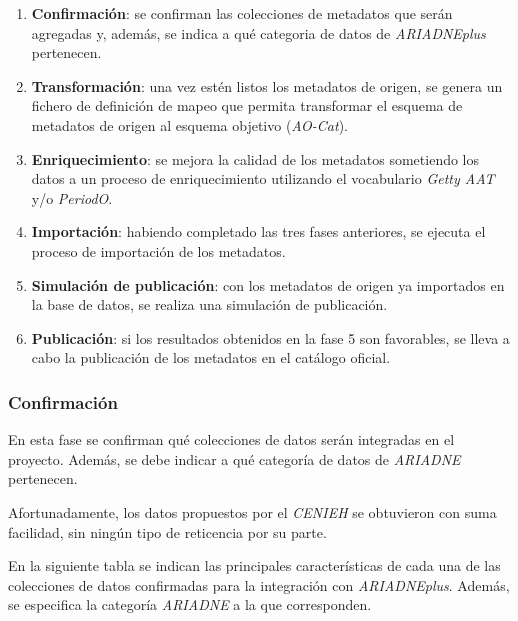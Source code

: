 \begin{enumerate}
\def\labelenumi{\arabic{enumi}.}
\tightlist
\item
  \textbf{Confirmación}: se confirman las colecciones de metadatos que
  serán agregadas y, además, se indica a qué categoria de datos de
  \emph{ARIADNEplus} pertenecen.
\item
  \textbf{Transformación}: una vez estén listos los metadatos de origen,
  se genera un fichero de definición de mapeo que permita transformar el
  esquema de metadatos de origen al esquema objetivo (\emph{AO-Cat}).
\item
  \textbf{Enriquecimiento}: se mejora la calidad de los metadatos
  sometiendo los datos a un proceso de enriquecimiento utilizando el
  vocabulario \emph{Getty AAT} y/o \emph{PeriodO}.
\item
  \textbf{Importación}: habiendo completado las tres fases anteriores,
  se ejecuta el proceso de importación de los metadatos.
\item
  \textbf{Simulación de publicación}: con los metadatos de origen ya
  importados en la base de datos, se realiza una simulación de
  publicación.
\item
  \textbf{Publicación}: si los resultados obtenidos en la fase 5 son
  favorables, se lleva a cabo la publicación de los metadatos en el
  catálogo oficial.
\end{enumerate}

\subsubsection{Confirmación}

En esta fase se confirman qué colecciones de datos serán integradas en
el proyecto. Además, se debe indicar a qué categoría de datos de \emph{ARIADNE}
pertenecen.


Afortunadamente, los datos propuestos por el \emph{CENIEH} se obtuvieron con suma facilidad,
sin ningún tipo de reticencia por su parte. 

En la siguiente tabla se indican las principales características de cada una de las
colecciones de datos confirmadas para la integración con \emph{ARIADNEplus}.
Además, se especifica la categoría \emph{ARIADNE} a la que corresponden.

